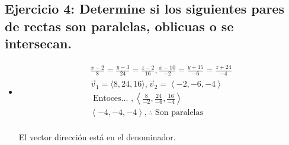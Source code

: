 \subsection{Ejercicio 4: Determine si los siguientes pares de rectas son paralelas, oblicuas o se intersecan.}
\begin{itemize}
    \item \begin{center}
        \begin{align*}
            \frac{x-2}{8} = \frac{y-3}{24} = \frac{z-2}{16} , \frac{x-10}{-2} = \frac{y+15}{-6} = \frac{z+24}{-4} \\ 
            \vec{v}_1 = \langle 8,24,16 \rangle, \vec{v}_2  = \left\langle -2,-6,-4 \right\rangle \\ 
            \text{  Entoces...  }, \left\langle \frac{8}{-2}, \frac{24}{-6} , \frac{16}{-4}   \right\rangle  \\ 
            \left\langle -4,-4,-4   \right\rangle, \therefore \text{  Son paralelas  } \\   
        \end{align*}
    \end{center}
    El vector dirección está en el denominador.
    

\end{itemize}

